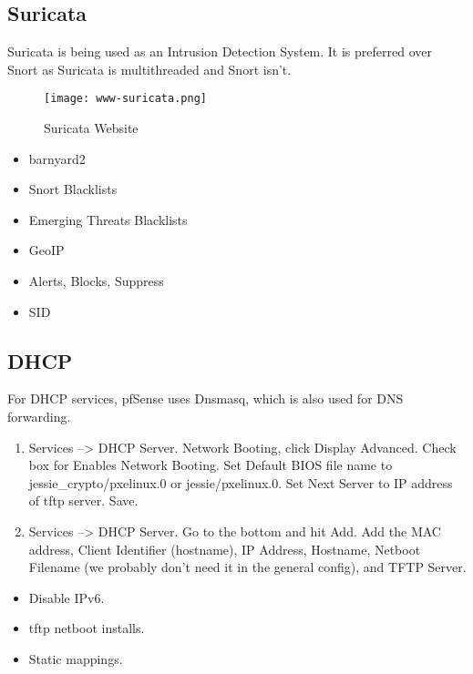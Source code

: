 \subsection{Suricata}
Suricata is being used as an Intrusion Detection System.
It is preferred over Snort as Suricata is multithreaded and Snort isn't.

\begin{figure}[h!]
\texttt{[image: www-suricata.png]}
 \caption{Suricata Website}
 \label{fig:www-suricata}
\end{figure}

\begin{itemize}
 \item barnyard2
 \item Snort Blacklists
 \item Emerging Threats Blacklists
 \item GeoIP
 \item Alerts, Blocks, Suppress
 \item SID
\end{itemize}


\subsection{DHCP}
For DHCP services, pfSense uses Dnsmasq, which is also used for DNS
forwarding.


\begin{enumerate}
 \item Services --> DHCP Server. Network Booting, click Display Advanced. Check box for Enables Network Booting. Set Default BIOS file name to jessie\_crypto/pxelinux.0 or jessie/pxelinux.0. Set Next Server to IP address of tftp server. Save.
 \item Services --> DHCP Server. Go to the bottom and hit Add. Add the MAC address, Client Identifier (hostname), IP Address, Hostname, Netboot Filename (we probably don't need it in the general config), and TFTP Server.
\end{enumerate}

\begin{itemize}
 \item Disable IPv6.
 \item tftp netboot installs.
 \item Static mappings.
\end{itemize}


